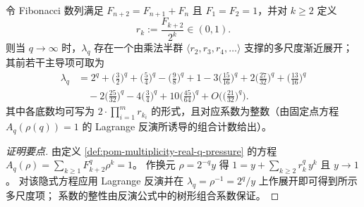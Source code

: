 

\begin{conclusion}\label{con:xi-terminal-replica-softcore-lambdaq-multiscale-transseries}
令 Fibonacci 数列满足 \(F_{n+2}=F_{n+1}+F_n\) 且 \(F_1=F_2=1\)，并对 \(k\ge 2\) 定义
\[
r_k:=\frac{F_{k+2}}{2^{k}}\in(0,1).
\]
则当 \(q\to\infty\) 时，\(\lambda_q\) 存在一个由乘法半群 \(\langle r_2,r_3,r_4,\dots\rangle\) 支撑的多尺度渐近展开；其前若干主导项可取为
\[
\begin{aligned}
\lambda_q
&=2^{q}
+\Big(\frac{3}{2}\Big)^{q}
+\Big(\frac{5}{4}\Big)^{q}
-\Big(\frac{9}{8}\Big)^{q}
+1
-3\Big(\frac{15}{16}\Big)^{q}
+2\Big(\frac{27}{32}\Big)^{q}
+\Big(\frac{13}{16}\Big)^{q}\\
&\quad
-2\Big(\frac{25}{32}\Big)^{q}
-4\Big(\frac{3}{4}\Big)^{q}
+10\Big(\frac{45}{64}\Big)^{q}
+O\!\Big(\Big(\frac{21}{32}\Big)^{q}\Big).
\end{aligned}
\]
其中各底数均可写为 \(2\cdot \prod_{i=1}^m r_{k_i}\) 的形式，且对应系数为整数（由固定点方程 \(A_q(\rho(q))=1\) 的 Lagrange 反演所诱导的组合计数给出）。
\end{conclusion}
\begin{proof}[证明要点]
由定义 \ref{def:pom-multiplicity-real-q-pressure} 的方程 \(A_q(\rho)=\sum_{k\ge 1}F_{k+2}^q\rho^k=1\)。
作换元 \(\rho=2^{-q}y\) 得
\(
1=y+\sum_{k\ge 2}r_k^q\,y^k
\)
且 \(y\to 1\)。
对该隐式方程应用 Lagrange 反演并在 \(\lambda_q=\rho^{-1}=2^q/y\) 上作展开即可得到所示多尺度项；
系数的整性由反演公式中的树形组合系数保证。
\end{proof}

